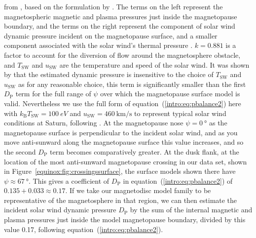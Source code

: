 from \citet{kanani2010}, based on the formulation by \citet{petrinec1997}. The terms on the left represent the magnetospheric magnetic and plasma pressures just inside the magnetopause boundary, and the terms on the right represent the component of solar wind dynamic pressure incident on the magnetopause surface, and a smaller component associated with the solar wind's thermal pressure \citep[see][]{kanani2010}. $k = 0.881$ is a factor to account for the diversion of flow around the magnetosphere obstacle, and $T_\mathrm{SW}$ and $u_\mathrm{SW}$ are the temperature and speed of the solar wind. It was shown by \citet{kanani2010} that the estimated dynamic pressure is insensitive to the choice of $T_\mathrm{SW}$ and $u_\mathrm{SW}$ as for any reasonable choice, this term is significantly smaller than the first $D_\mathrm{P}$ term for the full range of $\psi$ over which the magnetopause surface model is valid. Nevertheless we use the full form of equation~(\ref{intro:eq:pbalance2}) here with $k_\mathrm{B}T_\mathrm{SW} = \SI{100}{eV}$ and $u_\mathrm{SW} = \SI{460}{\km\per\second}$ to represent typical solar wind conditions at Saturn, following \citet{pilkington2015}. At the magnetopause nose $\psi = \SI{0}{\degree}$ as the magnetopause surface is perpendicular to the incident solar wind, and as you move anti-sunward along the magnetopause surface this value increases, and so the second $D_\mathrm{P}$ term becomes comparatively greater. At the dusk flank, at the location of the most anti-sunward magnetopause crossing in our data set, shown in Figure~\ref{equinox:fig:crossingssurface}, the \citet{pilkington2015} surface models shown there have $\psi \approx \SI{67}{\degree}$. This gives a coefficient of $D_\mathrm{P}$ in equation~(\ref{intro:eq:pbalance2}) of $0.135 + 0.033 \approx 0.17$. If we take our magnetodisc model family to be representative of the magnetosphere in that region, we can then estimate the incident solar wind dynamic pressure $D_\mathrm{P}$ by the sum of the internal magnetic and plasma pressures just inside the model magnetopause boundary, divided by this value 0.17, following equation~(\ref{intro:eq:pbalance2}).

